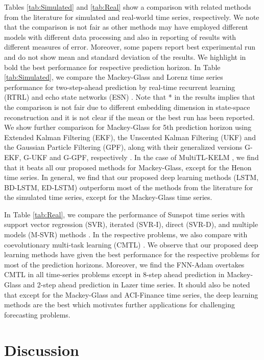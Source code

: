 \documentclass{ieeeaccess}
\begin{document}
   
 Tables \ref{tab:Simulated} and \ref{tab:Real} show  a comparison with related methods from the 
literature for simulated and real-world time series, respectively. We 
note that the comparison is not  fair as other 
methods may have employed different models with different 
  data processing and also in reporting of results with 
different measures of error. Moreover, some papers report best experimental run and do not show mean and standard deviation of the results. We highlight in bold the best performance for respective prediction horizon.  In Table \ref{tab:Simulated}, we compare the Mackey-Glass and Lorenz time series 
performance for  two-step-ahead prediction by real-time recurrent 
learning (RTRL) and  echo state networks (ESN) \cite{chang2012reinforced}. Note 
that * in  the results  implies  that the comparison 
is  not fair due to  different embedding 
dimension in state-space reconstruction  and it is not clear if the mean or the best run has been 
reported. We show further comparison for Mackey-Glass for 5th prediction horizon 
using Extended Kalman Filtering (EKF), the Unscented Kalman Filtering (UKF) and 
the
 Gaussian Particle Filtering (GPF),  along with their    generalized   
versions G-EKF, G-UKF
 and G-GPF, respectively \cite{Wu2013AMC}. In the case of MultiTL-KELM \cite{YE2019227}, we find that it   beats all our proposed methods for Mackey-Glass, except for the Henon time series.  In general, we find that our proposed deep learning methods (LSTM, BD-LSTM, ED-LSTM) outperform most of the methods from the literature for the simulated time series, except for the Mackey-Glass time series. 
 
In Table  \ref{tab:Real}, we compare the performance of Sunspot  time series  with support vector 
regression (SVR),  iterated (SVR-I), direct (SVR-D), and  multiple models
(M-SVR) methods \cite{zhang2013iterated}. In the respective problems, we also compare with   coevolutionary multi-task learning (CMTL) \cite{chandra2017CMTLMulti}.   We observe that  our proposed deep learning methods have given the best performance for the respective problems for most of the prediction horizons. Moreover, we find  the FNN-Adam overtakes  CMTL in all time-series problems except in 8-step ahead prediction in Mackey-Glass and 2-step ahead prediction in Lazer time series. It should also be noted that except for the Mackey-Glass and ACI-Finance time series, the deep learning methods are the best  which motivates   further applications   for challenging forecasting problems. 
 
 
 \section{Discussion}
 
\end{document}
